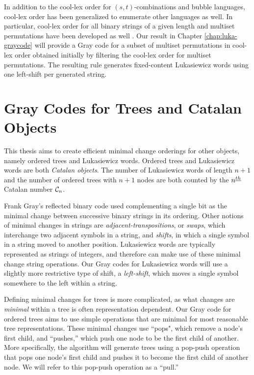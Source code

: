 In addition to the cool-lex order for $(s,t)$-combinations and bubble languages, cool-lex order has been generalized to enumerate other languages as well.  In particular, cool-lex order for all binary strings of a given length \cite{stevens2012coolest} and multiset permutations have been developed as well \cite{williams2009loopless}.  Our result in Chapter \ref{chap:luka-graycode} will provide a Gray code for a subset of multiset permutations in cool-lex order obtained initially by filtering the cool-lex order for multiset permutations.  The resulting rule generates fixed-content Lukasiewicz words using one left-shift per generated string.


\section{Gray Codes for Trees and Catalan Objects} \label{sec:intro_Graycodes}

This thesis aims to create efficient minimal change orderings for other objects, namely ordered trees and Lukasiewicz words.  Ordered trees and Lukasiewicz words are both \emph{Catalan objects}.  The number of Lukasiewicz words of length $n+1$ and the number of ordered trees with $n+1$ nodes are both counted by the $n^{\underline{th}}$ Catalan number $\mathcal{C}_n$.  

Frank Gray's reflected binary code used complementing a single bit as the minimal change between successive binary strings in its ordering.  Other notions of minimal changes in strings are \emph{adjacent-transpositions}, or \emph{swaps}, which interchange two adjacent symbols in a string, and \emph{shifts}, in which a single symbol in a string moved to another position. Lukasiewicz words are typically represented as strings of integers, and therefore can make use of these minimal change string operations.  Our Gray codes for Lukasiewicz words will use a slightly more restrictive type of shift, a \emph{left-shift}, which moves a single symbol somewhere to the left within a string. 




Defining minimal changes for trees is more complicated, as what changes are \emph{minimal} within a tree is often representation dependent.  Our Gray code for ordered trees aims to use simple operations that are minimal for most reasonable tree representations.  These minimal changes use ``pops", which remove a node's first child, and ``pushes,'' which push one node to be the first child of another.  More specifically, the algorithm will generate trees using a pop-push operation that pops one node's first child and pushes it to become the first child of another node.  We will refer to this pop-push operation as a ``pull.''

